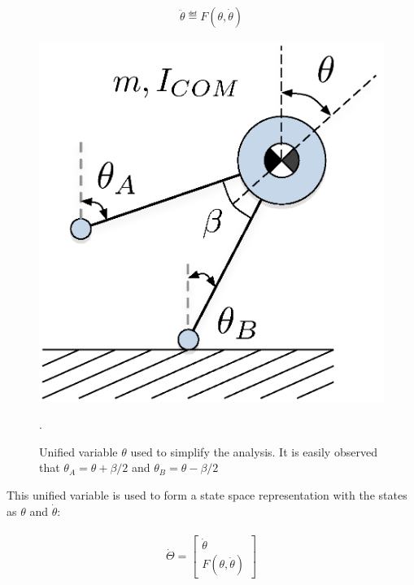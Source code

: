 \begin{equation}  
	\begin{aligned}
		\ddot{\theta} \eqdef F(\theta, \dot{\theta})
	\end{aligned}
\end{equation}

\begin{figure}[!b]
	\centering
    \includegraphics[scale=0.8]{fig/fpe/unifiedstate.eps} 
  	\caption{Unified variable $\theta$ used to simplify the analysis. It is easily observed that $\theta_A = \theta  + \beta /2$ and $\theta_B = \theta  - \beta /2$}.
	\label{fig:unified}
\end{figure}

This unified variable is used to form a state space representation with the states as $\theta$ and $\dot{\theta}$: 

\begin{equation} \label{ss}
	\begin{aligned}
				\begin{gathered}
  			\dot{\Theta} = \left[ {\begin{array}{*{20}{c}}
  {\dot \theta } \\ 
  {F(\theta, \dot{\theta})} 
							   \end{array}} \right]
		\end{gathered}
	\end{aligned}
\end{equation}

